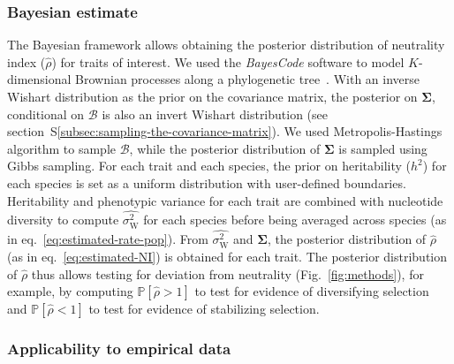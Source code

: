 \documentclass{article}
\newcommand{\UniDimArray}[1]{\bm{#1}}
\newcommand{\BiDimArray}[1]{\bm{#1}}
\newcommand{\proba}{\mathbb{P}}
\newcommand{\Heritability}{h^2}
\newcommand{\RateWhithin}{\sigma^2_{\mathrm{W}}}
\newcommand{\EstRateWhithin}{\widehat{\RateWhithin}}
\newcommand{\EstNI}{\widehat{\rho}}
\newcommand{\Ntrait}{K}
\newcommand{\Covariancematrix}{\Sigma}
\newcommand{\CovarianceMatrix}{\BiDimArray{\Covariancematrix}}
\newcommand{\brownian}{\mathcal{B}}
\newcommand{\Brownian}{\UniDimArray{\brownian}}
\begin{document}
\subsubsection{Bayesian estimate}
The Bayesian framework allows obtaining the posterior distribution of neutrality index ($\EstNI$) for traits of interest.
We used the \textit{BayesCode} software to model $\Ntrait$-dimensional Brownian processes along a phylogenetic tree~\parencite{latrille_inferring_2021}.
With an inverse Wishart distribution as the {prior} on the covariance matrix, the {posterior} on $\CovarianceMatrix$, conditional on $\brownian$ is also an invert Wishart distribution (see section~S\ref{subsec:sampling-the-covariance-matrix}).
We used Metropolis-Hastings algorithm to sample $\Brownian$, while the posterior distribution of $\CovarianceMatrix$ is sampled using Gibbs sampling.
For each trait and each species, the prior on heritability ($\Heritability$) for each species is set as a uniform distribution with user-defined boundaries.
Heritability and phenotypic variance for each trait are combined with nucleotide diversity to compute $\EstRateWhithin$ for each species before being averaged across species (as in eq.~\ref{eq:estimated-rate-pop}).
From $\EstRateWhithin$ and $\CovarianceMatrix$, the posterior distribution of $\EstNI$ (as in eq.~\ref{eq:estimated-NI}) is obtained for each trait.
The posterior distribution of $\EstNI$ thus allows testing for deviation from neutrality (Fig.~\ref{fig:methods}), for example, by computing $\proba [\EstNI > 1 ]$ to test for evidence of diversifying selection and $\proba [\EstNI < 1 ]$ to test for evidence of stabilizing selection.

\subsubsection{Applicability to empirical data}
\end{document}
